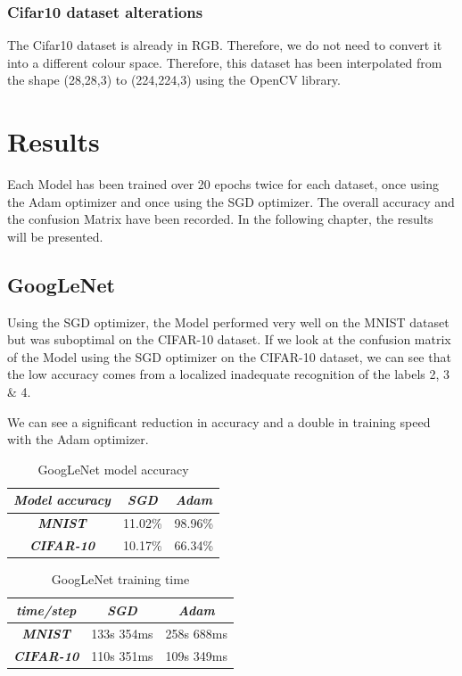 \documentclass[conference]{IEEEtran}
\begin{document}
\subsubsection{Cifar10 dataset alterations}
The Cifar10 dataset is already in RGB. Therefore, we do not need to convert it into a different colour space. 
Therefore, this dataset has been interpolated from the shape (28,28,3) to (224,224,3) using the OpenCV library.

\section{Results}
Each Model has been trained over 20 epochs twice for each dataset, once using the Adam optimizer and once using the SGD optimizer. 
The overall accuracy and the confusion Matrix have been recorded. In the following chapter, the results will be presented.

\subsection{GoogLeNet}
Using the SGD optimizer, the Model performed very well on the MNIST dataset but was suboptimal on the CIFAR-10 dataset. 
If we look at the confusion matrix of the Model using the SGD optimizer on the CIFAR-10 dataset, we can see that the low accuracy comes from a localized inadequate recognition of the labels 2, 3 \& 4.

We can see a significant reduction in accuracy and a double in training speed with the Adam optimizer.

\begin{table}[htbp]
    \caption{GoogLeNet model accuracy}
    \begin{center}
    \begin{tabular}{|c|c|c|}
    \cline{1-3} 
    \textit{Model accuracy} & \textbf{\textit{SGD}}& \textbf{\textit{Adam}} \\
    \hline
    \textbf{\textit{MNIST}} & 11.02\% & 98.96\% \\
    \hline
    \textbf{\textit{CIFAR-10}} & 10.17\% & 66.34\% \\
    \cline{1-3} 
    \end{tabular}
    \label{tab: GoogLeNet model accuracy}
    \end{center}
\end{table}

\begin{table}[htbp]
    \caption{GoogLeNet training time}
    \begin{center}
    \begin{tabular}{|c|c|c|}
    \cline{1-3} 
    \textit{time/step} & \textbf{\textit{SGD}}& \textbf{\textit{Adam}} \\
    \hline
    \textbf{\textit{MNIST}} & 133s 354ms & 258s 688ms \\
    \hline
    \textbf{\textit{CIFAR-10}} & 110s 351ms & 109s 349ms \\
    \cline{1-3} 
    \end{tabular}
    \label{tab: GoogLeNet training time}
    \end{center}
\end{table}
\end{document}
